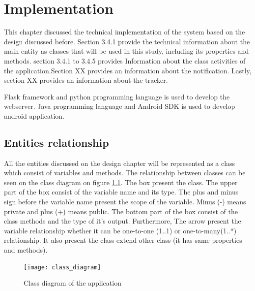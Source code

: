


\chapter{Implementation}
This chapter discussed the technical implementation of the system based on the design discussed before. Section 3.4.1 provide the technical information about the main entity as classes that will be used in this study, including its properties and methods.
section 3.4.1 to 3.4.5 provides Information about the class activities of the application.Section XX provides an information about the notification. Lastly, section XX provides an information about the tracker.


Flask framework and python programming language is used to develop the webserver. Java programming language and Android SDK is used to develop android application.





\section{Entities relationship}
All the entities discussed on the design chapter will be represented as a class which consist of variables and methods.
The relationship between classes can be seen on the class diagram on figure \ref{fig:class_diagram}.
 The box present the class. The upper part of the box consist of the variable name and its type.
 The plus and minus sign before the variable name present the scope of the variable.
  Minus (-) means private and plus (+) means public.
  The bottom part of the box consist of the class methods and the type of it's output.
  Furthermore, The arrow present the variable relationship whether it can be one-to-one (1..1)  or one-to-many(1..*) relationship.
  It also present the class extend other class (it has same properties and methods).

\begin{figure}
\begin{center}
\texttt{[image: class\_diagram]}
\end{center}
\caption{Class diagram of the application}
\label{fig:class_diagram}
\end{figure}


